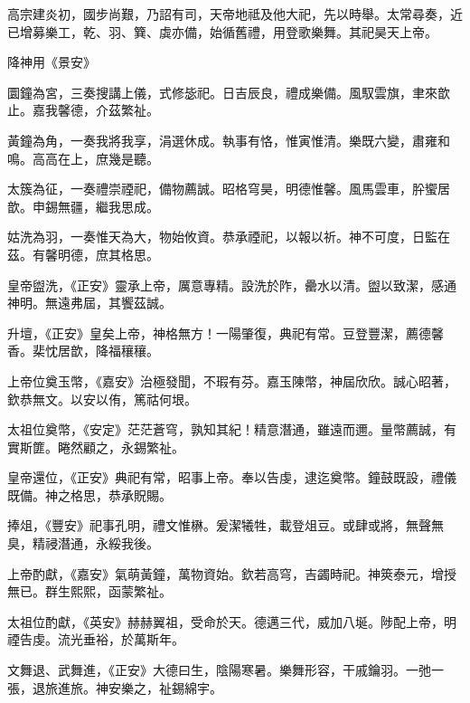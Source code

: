 \begin{pinyinscope}
 高宗建炎初，國步尚艱，乃詔有司，天帝地祗及他大祀，先以時舉。太常尋奏，近已增募樂工，乾、羽、簨、虡亦備，始循舊禮，用登歌樂舞。其祀昊天上帝。



 降神用《景安》



 圜鐘為宮，三奏搜講上儀，式修毖祀。日吉辰良，禮成樂備。風馭雲旗，聿來歆止。嘉我馨德，介茲繁祉。



 黃鐘為角，一奏我將我享，涓選休成。執事有恪，惟寅惟清。樂既六變，肅雍和鳴。高高在上，庶幾是聽。



 太簇為征，一奏禮崇禋祀，備物薦誠。昭格穹昊，明德惟馨。風馬雲車，肸蠁居歆。申錫無疆，繼我思成。



 姑洗為羽，一奏惟天為大，物始攸資。恭承禋祀，以報以祈。神不可度，日監在茲。有馨明德，庶其格思。



 皇帝盥洗，《正安》靈承上帝，厲意專精。設洗於阼，罍水以清。盥以致潔，感通神明。無遠弗屆，其饗茲誠。



 升壇，《正安》皇矣上帝，神格無方！一陽肇復，典祀有常。豆登豐潔，薦德馨香。棐忱居歆，降福穰穰。



 上帝位奠玉幣，《嘉安》治極發聞，不瑕有芬。嘉玉陳幣，神屆欣欣。誠心昭著，欽恭無文。以安以侑，篤祜何垠。



 太祖位奠幣，《安定》茫茫蒼穹，孰知其紀！精意潛通，雖遠而邇。量幣薦誠，有實斯篚。睠然顧之，永錫繁祉。



 皇帝還位，《正安》典祀有常，昭事上帝。奉以告虔，逮迄奠幣。鐘鼓既設，禮儀既備。神之格思，恭承貺賜。



 捧俎，《豐安》祀事孔明，禮文惟楙。爰潔犧牲，載登俎豆。或肆或將，無聲無臭，精祲潛通，永綏我後。



 上帝酌獻，《嘉安》氣萌黃鐘，萬物資始。欽若高穹，吉蠲時祀。神筴泰元，增授無已。群生熙熙，函蒙繁祉。



 太祖位酌獻，《英安》赫赫翼祖，受命於天。德邁三代，威加八埏。陟配上帝，明禋告虔。流光垂裕，於萬斯年。



 文舞退、武舞進，《正安》大德曰生，陰陽寒暑。樂舞形容，干戚鑰羽。一弛一張，退旅進旅。神安樂之，祉錫綿宇。




\end{pinyinscope}

